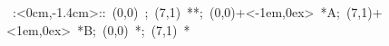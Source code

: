 

\hbox{
\xy    <1cm,0cm>:<0cm,-1.4cm>::
       (0,0) ; (7,1) **\dir{-}; 
       (0,0)+<-1em,0ex> *{A};
       (7,1)+<1em,0ex> *{B};
	(0,0) *{\bullet};
	(7,1) *{\bullet}
       \endxy}
	   
